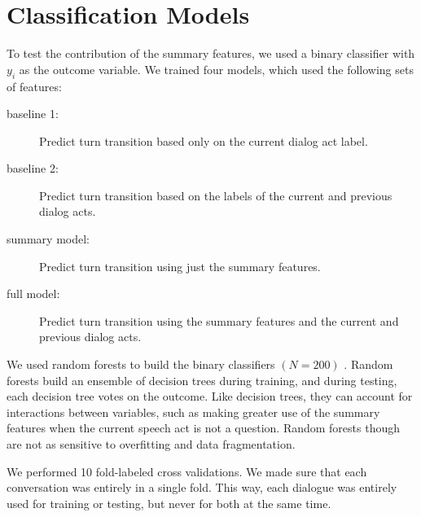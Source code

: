\section{Classification Models}

    To test the contribution of the summary features, we used a binary classifier with
    $y_i$ as the outcome variable. We trained four models, which used the following sets of features:

    \begin{description}
        \item[baseline 1:] Predict turn transition based only on the current dialog act label.
        \item[baseline 2:] Predict turn transition based on the labels of the current and previous dialog acts.
        \item[summary model:] Predict turn transition using just the summary features.
        \item[full model:] Predict turn transition using the summary features and the current and previous dialog acts.
    \end{description}


We used random forests to build the binary classifiers $(N=200)$ \cite{Breiman01randomforests}. Random forests build an ensemble of decision trees during training, and during testing, each decision tree votes on the outcome.  Like decision trees, they can account for interactions between variables, such as making greater use of the summary features when the current speech act is not a question.  Random forests though are not as sensitive to overfitting and data fragmentation.

We performed 10 fold-labeled cross validations.  We made sure that each conversation was entirely in a single fold. This way, each dialogue was entirely used for training or testing, but never for both at the same time.

